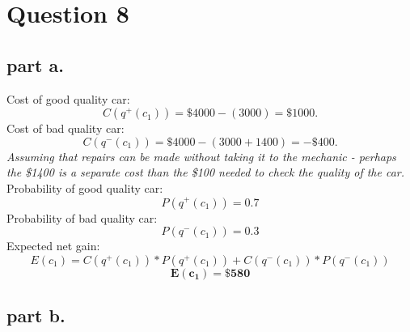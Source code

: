 \section{Question 8}

\subsection{part a.}
Cost of good quality car:
\begin{equation}
\label{eq:c+}
C(q^+(c_1)) = \$ 4000 - (3000) = \$1000.
\end{equation}
Cost of bad quality car:
\begin{equation}
\label{eq:c-}
C(q^-(c_1)) = \$ 4000 - (3000 + 1400) = -\$400. 
\end{equation}
\textit{Assuming that repairs can be made without taking it to the mechanic - perhaps the \$1400 is a separate cost than the \$100 needed to check the quality of the car.} \\
Probability of good quality car:
\begin{equation}
\label{eq:+}
	P(q^+(c_1)) = 0.7
\end{equation}
Probability of bad quality car:
\begin{equation}
\label{eq:-}
	P(q^-(c_1)) = 0.3
\end{equation}
Expected net gain:
\[E(c_1) = C(q^+(c_1))*P(q^+(c_1)) + C(q^-(c_1))*P(q^-(c_1))\]
\begin{equation} 
\label{eq:expected_value} 
\mathbf{E(c_1) = \$580} 
\end{equation}


\subsection{part b.}

